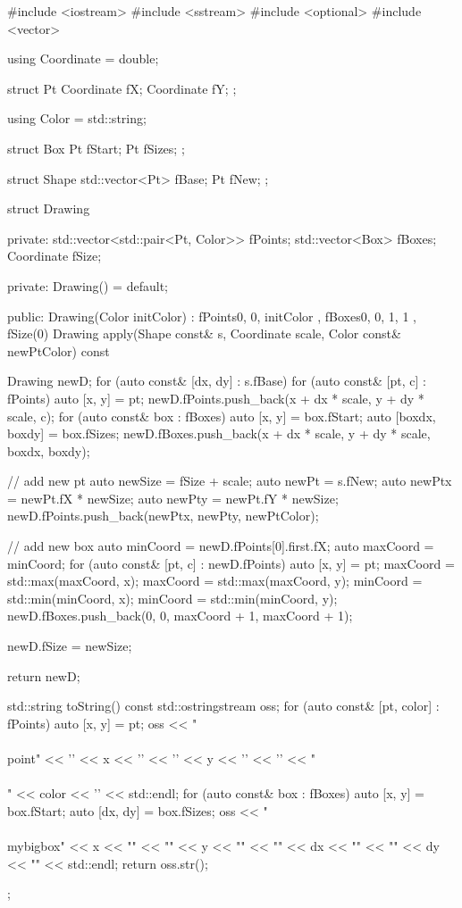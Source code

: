 \documentclass[11pt]{article}
\newcommand*{\scalePic}{0.4}
\newcommand*{\gridArg}[7]{%
    \foreach \x in {\fpeval{#1},\fpeval{#1+#2},...,\fpeval{#3+0.0001}} %
        \draw [black, thin, #7] (\x,\fpeval{#4}) -- (\x,\fpeval{#6+0.0001});
    \foreach \y in {\fpeval{#4},\fpeval{#4+#5},...,\fpeval{#6+0.0001}}
        \draw [black, thin, #7] (\fpeval{#1},\y) -- (\fpeval{#3+0.0001},\y);
}
\newcommand*{\grid}[6]{\gridArg{#1}{#2}{#3}{#4}{#5}{#6}{}}%
\newcommand*{\mybigbox}[4]{\grid{#1}{#3}{#1+#3}{#2}{#4}{#2+#4}} %
\newcommand*{\point}[3]{\node at (#1 + 0.5, #2 + 0.5)[circle, fill, inner sep=\scalePic*5pt, #3]{}; \gridArg{#1}{1}{#1+1}{#2}{1}{#2+1}{draw=none}}
\begin{document}
\begin{VerbatimOut}{\src}
#include <iostream>
#include <sstream>
#include <optional>
#include <vector>

using Coordinate = double;

struct Pt {
  Coordinate fX;
  Coordinate fY;
};

using Color = std::string;

struct Box {
    Pt fStart;
    Pt fSizes;
};

struct Shape {
    std::vector<Pt> fBase;
    Pt fNew;
};

struct Drawing {
  private:
    std::vector<std::pair<Pt, Color>> fPoints;
    std::vector<Box> fBoxes;
    Coordinate fSize;

  private:
    Drawing() = default;

  public:
    Drawing(Color initColor)
        : fPoints{{{0, 0}, initColor}}
        , fBoxes{{{0, 0}, {1, 1}}}
        , fSize(0) {
    }
    Drawing apply(Shape const& s, Coordinate scale, Color const& newPtColor) const {
        Drawing newD;
        for (auto const& [dx, dy] : s.fBase) {
            for (auto const& [pt, c] : fPoints) {
                auto [x, y] = pt;
                newD.fPoints.push_back({{x + dx * scale, y + dy * scale}, c});
            }
            for (auto const& box : fBoxes) {
                auto [x, y] = box.fStart;
                auto [boxdx, boxdy] = box.fSizes;
                newD.fBoxes.push_back({{x + dx * scale, y + dy * scale}, {boxdx, boxdy}});
            }
        }

        // add new pt
        auto newSize = fSize + scale;
        auto newPt = s.fNew;
        auto newPtx = newPt.fX * newSize;
        auto newPty = newPt.fY * newSize;
        newD.fPoints.push_back({{newPtx, newPty}, newPtColor});

        // add new box
        auto minCoord = newD.fPoints[0].first.fX;
        auto maxCoord = minCoord;
        for (auto const& [pt, c] : newD.fPoints) {
            auto [x, y] = pt;
            maxCoord = std::max(maxCoord, x);
            maxCoord = std::max(maxCoord, y);
            minCoord = std::min(minCoord, x);
            minCoord = std::min(minCoord, y);
        }
        newD.fBoxes.push_back({{0, 0}, {maxCoord + 1, maxCoord + 1}});
        
        newD.fSize = newSize;
        
        return newD;
    }
    
    std::string toString() const {
        std::ostringstream oss;
        for (auto const& [pt, color] : fPoints) {
            auto [x, y] = pt;
            oss << "\\\\point" << '{' << x << '}' << '{' << y << '}' << '{' << "\\\\" << color << '}' << std::endl;
        }
        for (auto const& box : fBoxes) {
            auto [x, y] = box.fStart;
            auto [dx, dy] = box.fSizes;
            oss << "\\\\mybigbox{" << x << "}" << "{" << y << "}" << "{" << dx << "}" << "{" << dy << "}" << std::endl;
        }
        return oss.str();
    }
};


\end{VerbatimOut}
\end{document}
